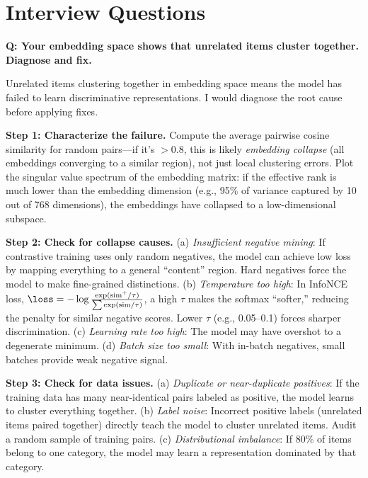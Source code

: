 \section{Interview Questions}
\label{sec:embedding_questions}


\begin{interviewq}
\textbf{Q: Your embedding space shows that unrelated items cluster together. Diagnose and fix.}

 \quad {} \quad \badgefreq{\freqmed}

\stronganswer

Unrelated items clustering together in embedding space means the model has failed to learn discriminative representations. I would diagnose the root cause before applying fixes.

\textbf{Step 1: Characterize the failure.} Compute the average pairwise cosine similarity for random pairs---if it's $>0.8$, this is likely \textit{embedding collapse} (all embeddings converging to a similar region), not just local clustering errors. Plot the singular value spectrum of the embedding matrix: if the effective rank is much lower than the embedding dimension (e.g., 95\% of variance captured by 10 out of 768 dimensions), the embeddings have collapsed to a low-dimensional subspace.

\textbf{Step 2: Check for collapse causes.} (a) \textit{Insufficient negative mining}: If contrastive training uses only random negatives, the model can achieve low loss by mapping everything to a general ``content'' region. Hard negatives force the model to make fine-grained distinctions. (b) \textit{Temperature too high}: In InfoNCE loss, $\loss = -\log \frac{\exp(\text{sim}^+/\tau)}{\sum \exp(\text{sim}/\tau)}$, a high $\tau$ makes the softmax ``softer,'' reducing the penalty for similar negative scores. Lower $\tau$ (e.g., 0.05--0.1) forces sharper discrimination. (c) \textit{Learning rate too high}: The model may have overshot to a degenerate minimum. (d) \textit{Batch size too small}: With in-batch negatives, small batches provide weak negative signal.

\textbf{Step 3: Check for data issues.} (a) \textit{Duplicate or near-duplicate positives}: If the training data has many near-identical pairs labeled as positive, the model learns to cluster everything together. (b) \textit{Label noise}: Incorrect positive labels (unrelated items paired together) directly teach the model to cluster unrelated items. Audit a random sample of training pairs. (c) \textit{Distributional imbalance}: If 80\% of items belong to one category, the model may learn a representation dominated by that category.


\end{interviewq}
